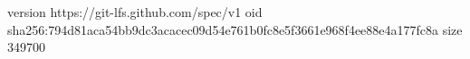 version https://git-lfs.github.com/spec/v1
oid sha256:794d81aca54bb9dc3acacec09d54e761b0fc8e5f3661e968f4ee88e4a177fc8a
size 349700

